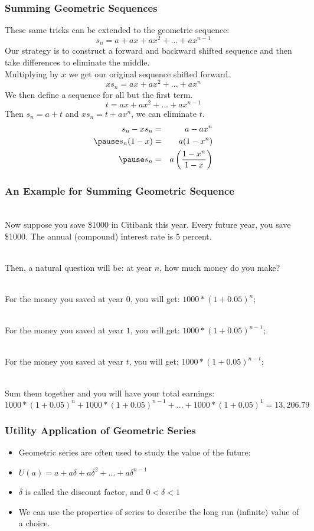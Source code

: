 \documentclass{beamer}
\numberwithin{equation}{section}
\begin{document}
\begin{frame}
\frametitle{Summing Geometric Sequences}
These same tricks can be extended to the geometric sequence:
$$s_n=a+ax+ax^2+...+ax^{n-1}$$ \pause
Our strategy is to construct a forward and backward shifted sequence and then take differences to eliminate the middle.\pause
\ \\Multiplying by $x$ we get our original sequence shifted forward.
$$xs_n=ax+ax^2+...+ax^n$$ \pause
We then define a sequence for all but the first term.
$$t=ax+ax^2+...+ax^{n-1}$$ \pause 
Then $s_n=a+t$ and $xs_n=t+ax^n$, we can eliminate $t$.  
\begin{eqnarray}
s_n-xs_n&=&a-ax^n \nonumber\\ \pause
s_n(1-x)&=&a(1-x^n) \nonumber\\ \pause
s_n &=& a\left({\frac{1-x^n}{1-x}}\right)  \nonumber
\end{eqnarray}

\end{frame}



\begin{frame}
\frametitle{An Example for Summing Geometric Sequence}

\ \\Now suppose you save \$1000 in Citibank this year. Every future year, you save \$1000. The annual (compound) interest rate is 5 percent. \pause

\ \\Then, a natural question will be: at year $n$, how much money do you make? \pause

\ \\For the money you saved at year $0$, you will get: $1000 * (1 + 0.05)^{n}$; \pause

\ \\For the money you saved at year $1$, you will get: $1000 * (1 + 0.05)^{n-1}$; \pause

\ \\For the money you saved at year $t$, you will get: $1000 * (1 + 0.05)^{n-t}$; \pause

\ \\Sum them together and you will have your total earnings: 
$$1000 * (1 + 0.05)^{n} + 1000 * (1 + 0.05)^{n-1} + ... + 1000 * (1 + 0.05)^{1}=13,206.79$$

\end{frame}

\begin{frame}
\frametitle{Utility Application of Geometric Series}
\begin{itemize}
\item Geometric series are often used to study the value of the future:
\item $U(a)=a+a\delta+a\delta^2+...+a\delta^{n-1}$ \pause
\item $\delta$ is called the discount factor, and  $0<\delta<1$ \pause
\item We can use the properties of series to describe the long run (infinite) value of a choice.
\end{itemize}

\end{frame}
\end{document}

